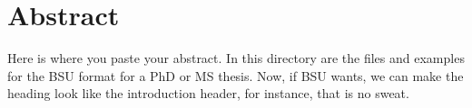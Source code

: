 
\chapter*{Abstract}

Here is where you paste your abstract. In this directory are the
files and examples for the BSU format for a PhD or MS thesis. Now, 
if BSU wants, we can make the heading look like the introduction 
header, for instance, that is no sweat.



